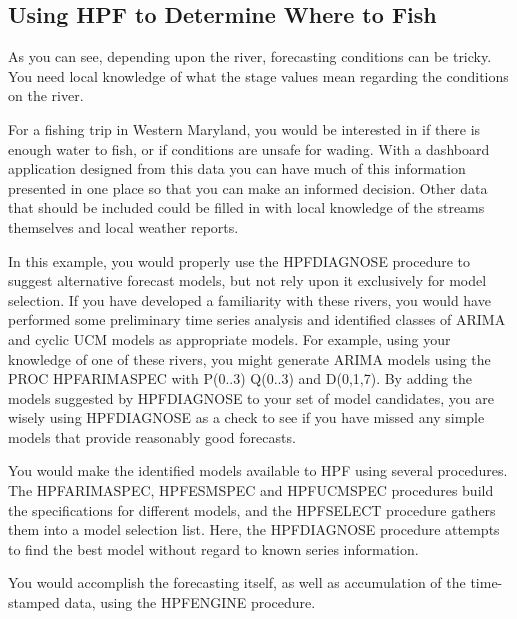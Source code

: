 \documentclass[10pt]{sugconf-ish}
\begin{document}
\newpage
\subsection{Using HPF to Determine Where to Fish}
As you can see, depending upon the river, forecasting conditions can be tricky. You need local knowledge of what the stage values mean regarding the conditions on the river.  

For a fishing trip in Western Maryland, you would be interested in if there is enough water to fish, or if conditions are unsafe for wading.  With a dashboard application designed from this data you can have much of this information presented in one place so that you can make an informed decision. Other data that should be included could be filled in with local knowledge of the streams themselves and local weather reports.

In this example, you would properly use the HPFDIAGNOSE procedure to suggest alternative forecast models, but not rely upon it exclusively for model selection. If you have developed a familiarity with these  rivers, you would have performed some preliminary time series analysis and identified classes of ARIMA and cyclic UCM models as appropriate models. For example, using your knowledge of one of these rivers, you might generate ARIMA models using the PROC HPFARIMASPEC with P(0..3) Q(0..3) and D(0,1,7). By adding the models suggested by HPFDIAGNOSE to your set of model candidates, you are wisely using HPFDIAGNOSE as a check to see if you have missed any simple models that provide reasonably good forecasts.

You would make the identified models available to HPF using several procedures. The HPFARIMASPEC, HPFESMSPEC and HPFUCMSPEC procedures build the specifications for different models, and the HPFSELECT procedure gathers them into a model selection list. Here, the HPFDIAGNOSE procedure attempts to find the best model without regard to known series information. 

You would accomplish the forecasting itself, as well as accumulation of the time-stamped data, using the HPFENGINE procedure.
\end{document}
